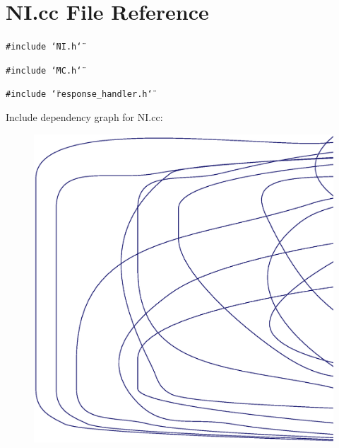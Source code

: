\section{NI.cc File Reference}
\label{NI_8cc}
{\tt \#include \char`\"{}NI.h\char`\"{}}\par
{\tt \#include \char`\"{}MC.h\char`\"{}}\par
{\tt \#include \char`\"{}response\_\-handler.h\char`\"{}}\par


Include dependency graph for NI.cc:\nopagebreak
\begin{figure}[H]
\begin{center}
\leavevmode
\includegraphics[width=420pt]{NI_8cc__incl}
\end{center}
\end{figure}
